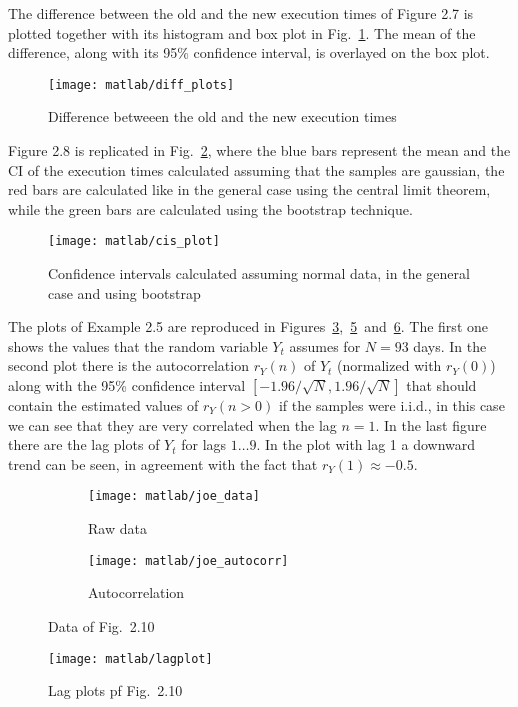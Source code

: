 \documentclass{article}
\begin{document}
    The difference between the old and the new execution times of
    Figure 2.7 is plotted together with its histogram and box plot in
    Fig.~\ref{diff_plots}. The mean of the difference, along with its
    95\% confidence interval, is overlayed on the box plot.
    \begin{figure}[htbp]
    \centering
    \texttt{[image: matlab/diff\_plots]}
    \caption{Difference betweeen the old and the new execution times}
    \label{diff_plots}
    \end{figure}
    
    Figure 2.8 is replicated in Fig.~\ref{cis_plot}, where the blue
    bars represent the mean and the CI of the execution times
    calculated assuming that the samples are gaussian, the red bars
    are calculated like in the general case using the central limit
    theorem, while the green bars are calculated using the bootstrap
    technique.
    \begin{figure}[htbp]
    \centering
    \texttt{[image: matlab/cis\_plot]}
    \caption{Confidence intervals calculated assuming normal data, in
      the general case and using bootstrap}
    \label{cis_plot}
    \end{figure}
    
    The plots of Example 2.5 are reproduced in
    Figures~\ref{joe_data},~\ref{joe_autocorr}~and~\ref{joe_lagplot}. The
    first one shows the values that the random variable $Y_t$ assumes
    for $N = 93$ days. In the second plot there is the autocorrelation
    $r_Y(n)$ of $Y_t$ (normalized with $r_Y(0)$) along with the 95\%
    confidence interval $[-1.96/\sqrt{N}, 1.96/\sqrt{N}]$ that should
    contain the estimated values of $r_Y(n>0)$ if the samples were
    i.i.d., in this case we can see that they are very correlated when
    the lag $n=1$.  In the last figure there are the lag plots of
    $Y_t$ for lags $1\dots9$. In the plot with lag 1 a downward trend
    can be seen, in agreement with the fact that $r_Y(1) \approx
    -0.5$.
    \begin{figure}[htbp]
      \centering
      \begin{subfigure}{.5\textwidth}
        \centering
        \texttt{[image: matlab/joe\_data]}
        \caption{Raw data}
        \label{joe_data}
      \end{subfigure}%
      \begin{subfigure}{.5\textwidth}
        \centering
        \texttt{[image: matlab/joe\_autocorr]}
        \caption{Autocorrelation}
        \label{joe_autocorr}
      \end{subfigure}
      \caption{Data of Fig.~2.10}
    \end{figure}
    \begin{figure}[htbp]
      \centering
      \texttt{[image: matlab/lagplot]}
      \caption{Lag plots pf Fig.~2.10}
      \label{joe_lagplot}
    \end{figure}
    
\end{document}

